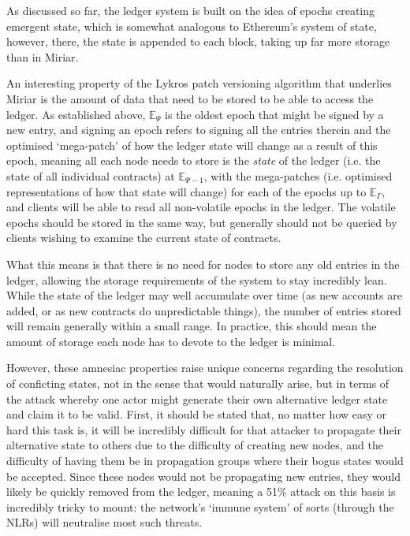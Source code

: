 \documentclass{extreport}
\begin{document}
As discussed so far, the ledger system is built on the idea of epochs creating emergent state, which is somewhat analogous to Ethereum's system of state, however, there, the state is appended to each block, taking up far more storage than in Miriar.

An interesting property of the Lykros patch versioning algorithm that underlies Miriar is the amount of data that need to be stored to be able to access the ledger. As established above, \(\mathbb{E}_\Psi\) is the oldest epoch that might be signed by a new entry, and signing an epoch refers to signing all the entries therein and the optimised `mega-patch' of how the ledger state will change as a result of this epoch, meaning all each node needs to store is the \emph{state} of the ledger (i.e. the state of all individual contracts) at \(\mathbb{E}_{\Psi - 1}\), with the mega-patches (i.e. optimised representations of how that state will change) for each of the epochs up to \(\mathbb{E}_\Gamma\), and clients will be able to read all non-volatile epochs in the ledger. The volatile epochs should be stored in the same way, but generally should not be queried by clients wishing to examine the current state of contracts.

What this means is that there is no need for nodes to store any old entries in the ledger, allowing the storage requirements of the system to stay incredibly lean. While the state of the ledger may well accumulate over time (as new accounts are added, or as new contracts do unpredictable things), the number of entries stored will remain generally within a small range. In practice, this should mean the amount of storage each node has to devote to the ledger is minimal.

However, these amnesiac properties raise unique concerns regarding the resolution of conficting states, not in the sense that would naturally arise, but in terms of the attack whereby one actor might generate their own alternative ledger state and claim it to be valid. First, it should be stated that, no matter how easy or hard this task is, it will be incredibly difficult for that attacker to propagate their alternative state to others due to the difficulty of creating new nodes, and the difficulty of having them be in propagation groups where their bogus states would be accepted. Since these nodes would not be propagating new entries, they would likely be quickly removed from the ledger, meaning a 51\% attack on this basis is incredibly tricky to mount: the network's `immune system' of sorts (through the NLRs) will neutralise most such threats.
\end{document}
